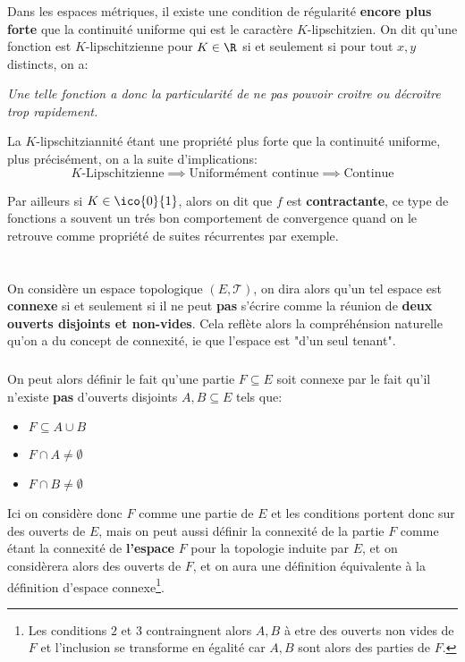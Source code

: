 \subsection*{}
Dans les espaces métriques, il existe une condition de régularité \textbf{encore plus forte} que la continuité uniforme qui est le caractère \(K\)-lipschitzien. On dit qu'une fonction est \(K\)-lipschitzienne pour \(K \in \R\) si et seulement si pour tout \(x, y\) distincts, on a:
\begin{center}
   \textit{
      Une telle fonction a donc la particularité de ne pas pouvoir croitre ou décroitre trop rapidement.
   }
\end{center}
La \(K\)-lipschitziannité étant une propriété plus forte que la continuité uniforme, plus précisément, on a la suite d'implications:
\[
   K\text{-Lipschitzienne} \implies \text{Uniformément continue} \implies \text{Continue}
\]


Par ailleurs si \(K \in \ico{0}{1}\), alors on dit que \(f\) est \textbf{contractante}, ce type de fonctions a souvent un trés bon comportement de convergence quand on le retrouve comme propriété de suites récurrentes par exemple.

\chapter*{}
On considère un espace topologique \((E, \mathcal{T})\), on dira alors qu'un tel espace est \textbf{connexe} si et seulement si il ne peut \textbf{pas} s'écrire comme la réunion de \textbf{deux ouverts disjoints et non-vides}. Cela reflète alors la compréhénsion naturelle qu'on a du concept de connexité, ie que l'espace est "d'un seul tenant".
\subsection*{}
On peut alors définir le fait qu'une partie \(F \subseteq E\) soit connexe par le fait qu'il n'existe \textbf{pas} d'ouverts disjoints \(A, B \subseteq E\) tels que:
\begin{itemize}
   \item \(F \subseteq A \cup B\)
   \item \(F \cap A \neq \emptyset\)
   \item \(F \cap B \neq \emptyset\)
\end{itemize}
Ici on considère donc \(F\) comme une partie de \(E\) et les conditions portent donc sur des ouverts de \(E\), mais on peut aussi définir la connexité de la partie \(F\) comme étant la connexité de \textbf{l'espace} \(F\) pour la topologie induite par \(E\), et on considèrera alors des ouverts de \(F\), et on aura une définition équivalente à la définition d'espace connexe\footnote[1]{Les conditions \(2\) et \(3\) contraingnent alors \(A, B\) à etre des ouverts non vides de \(F\) et l'inclusion se transforme en égalité car \(A, B\) sont alors des parties de \(F\).}.


